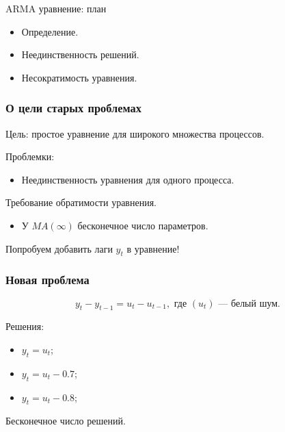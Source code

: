 
\begin{frame} %


\end{frame}



\begin{frame}{ARMA уравнение: план}
  \begin{itemize}[<+->]
    \item Определение. 
    \item Неединственность решений.
    \item Несократимость уравнения.
  \end{itemize}

\end{frame}

\begin{frame}
  \frametitle{О цели старых проблемах}

  Цель: простое уравнение для широкого множества процессов. 

  \pause

  Проблемки:   
  \begin{itemize}
    \item \alert{Неединственность уравнения} для одного процесса. 
  \end{itemize}
  \pause 

  Требование \alert{обратимости уравнения}. \pause
  \begin{itemize}
    \item У $MA(\infty)$ \alert{бесконечное} число параметров. 
  \end{itemize}
    
  \pause
  Попробуем \alert{добавить лаги} $y_t$ в уравнение!

  
\end{frame}


\begin{frame}
  \frametitle{Новая проблема}

  \[
  y_t  - y_{t-1} = u_t - u_{t-1}, \text{ где } (u_t) \text{ — белый шум.}  
  \]

  \pause
  Решения:
  \pause 
  \begin{itemize}[<+->]
    \item $y_t = u_t$;
    \item $y_t = u_t - 0.7$;
    \item $y_t = u_t - 0.8$;
  \end{itemize}

  \pause
  
  \alert{Бесконечное} число решений. 

\end{frame}


